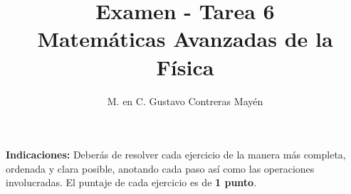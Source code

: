 
\usepackage{apacite}
\title{Examen - Tarea 6 \\[0.3em]  \large{Matemáticas Avanzadas de la Física}\vspace{-3ex}}
\author{M. en C. Gustavo Contreras Mayén}
\date{ }

\vspace{-4cm}
\maketitle
\fontsize{14}{14}\selectfont

\textbf{Indicaciones: } Deberás de resolver cada ejercicio de la manera más completa, ordenada y clara posible, anotando cada paso así como las operaciones involucradas. El puntaje de cada ejercicio es de \textbf{1 punto}.

